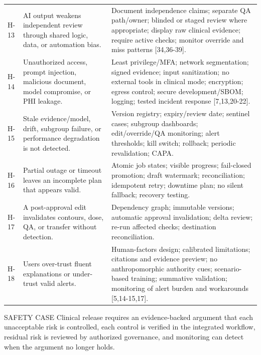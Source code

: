 \documentclass[11pt,letterpaper]{article}
\begin{document}
\begin{small}
\begin{longtable}{@{}L{0.0639\textwidth}L{0.3244\textwidth}L{0.5318\textwidth}@{}}
\addlinespace[2pt]
H-13 & AI output weakens independent review through shared logic, data, or automation bias. & Document independence claims; separate QA path\slash\allowbreak{}owner; blinded or staged review where appropriate; display raw clinical evidence; require active checks; monitor override and miss patterns [34,36-39]. \\
\addlinespace[2pt]
H-14 & Unauthorized access, prompt injection, malicious document, model compromise, or PHI leakage. & Least privilege\slash\allowbreak{}MFA; network segmentation; signed evidence; input sanitization; no external tools in clinical mode; encryption; egress control; secure development\slash\allowbreak{}SBOM; logging; tested incident response [7,13,20-22]. \\
\addlinespace[2pt]
H-15 & Stale evidence\slash\allowbreak{}model, drift, subgroup failure, or performance degradation is not detected. & Version registry; expiry\slash\allowbreak{}review date; sentinel cases; subgroup dashboards; edit\slash\allowbreak{}override\slash\allowbreak{}QA monitoring; alert thresholds; kill switch; rollback; periodic revalidation; CAPA. \\
\addlinespace[2pt]
H-16 & Partial outage or timeout leaves an incomplete plan that appears valid. & Atomic job states; visible progress; fail-closed promotion; draft watermark; reconciliation; idempotent retry; downtime plan; no silent fallback; recovery testing. \\
\addlinespace[2pt]
H-17 & A post-approval edit invalidates contours, dose, QA, or transfer without detection. & Dependency graph; immutable versions; automatic approval invalidation; delta review; re-run affected checks; destination reconciliation. \\
\addlinespace[2pt]
H-18 & Users over-trust fluent explanations or under-trust valid alerts. & Human-factors design; calibrated limitations; citations and evidence preview; no anthropomorphic authority cues; scenario-based training; summative validation; monitoring of alert burden and workarounds [5,14-15,17]. \\
\end{longtable}
\end{small}

\begin{nlnotice}{SAFETY CASE}
Clinical release requires an evidence-backed argument that each unacceptable risk is controlled, each control is verified in the integrated workflow, residual risk is reviewed by authorized governance, and monitoring can detect when the argument no longer holds.
\end{nlnotice}
\end{document}
